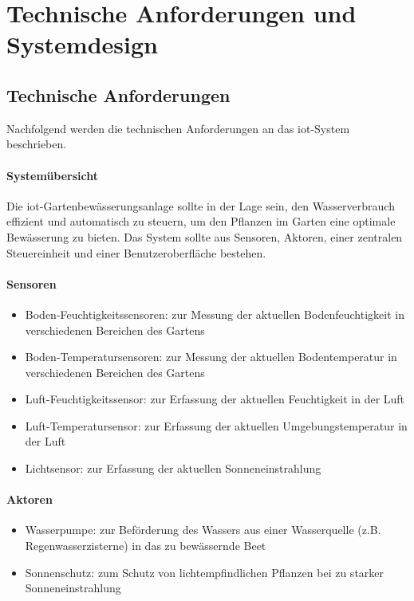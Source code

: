 
\section{Technische Anforderungen und Systemdesign}

\subsection{Technische Anforderungen}
Nachfolgend werden die technischen Anforderungen an das \gls{iot}-System beschrieben.

\paragraph{Systemübersicht}
Die \gls{iot}-Gartenbewässerungsanlage sollte in der Lage sein, den Wasserverbrauch effizient und automatisch zu steuern, um den Pflanzen im Garten eine optimale Bewässerung zu bieten. Das System sollte aus Sensoren, Aktoren, einer zentralen Steuereinheit und einer Benutzeroberfläche bestehen.

\paragraph{Sensoren}
\begin{itemize}
  \item Boden-Feuchtigkeitssensoren: zur Messung der aktuellen Bodenfeuchtigkeit in verschiedenen Bereichen des Gartens
  \item Boden-Temperatursensoren: zur Messung der aktuellen Bodentemperatur in verschiedenen Bereichen des Gartens
  \item Luft-Feuchtigkeitssensor: zur Erfassung der aktuellen Feuchtigkeit in der Luft
  \item Luft-Temperatursensor: zur Erfassung der aktuellen Umgebungstemperatur in der Luft
  \item Lichtsensor: zur Erfassung der aktuellen Sonneneinstrahlung
\end{itemize}

\paragraph{Aktoren}
\begin{itemize}
  \item Wasserpumpe: zur Beförderung des Wassers aus einer Wasserquelle (z.B. Regenwasserzisterne) in das zu bewässernde Beet
  \item Sonnenschutz: zum Schutz von lichtempfindlichen Pflanzen bei zu starker Sonneneinstrahlung
\end{itemize}

